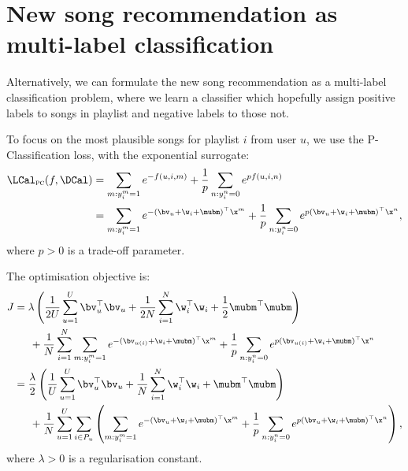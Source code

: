 \section{New song recommendation as multi-label classification}

Alternatively, we can formulate the new song recommendation as a multi-label classification problem,
where we learn a classifier which hopefully assign positive labels to songs in playlist and negative labels to those not.

To focus on the most plausible songs for playlist $i$ from user $u$,
we use the P-Classification loss, with the exponential surrogate:
\begin{equation*}
\begin{aligned}
\LCal_\textsc{pc}(f, \DCal) 
&= \sum_{m: y_i^m = 1} e^{-f(u, i, m)} + \frac{1}{p} \sum_{n: y_i^n = 0} e^{p f(u, i, n)} \\
&= \sum_{m: y_i^m = 1} e^{-(\bv_u + \w_i + \mubm)^\top \x^m} 
   + \frac{1}{p} \sum_{n: y_i^n = 0} e^{p (\bv_u + \w_i + \mubm)^\top \x^n},
\end{aligned}
\end{equation*}
where $p > 0$ is a trade-off parameter.

The optimisation objective is:
\begin{equation*}
\begin{aligned}
J &= \lambda \left( \frac{1}{2 U} \sum_{u=1}^U \bv_u^\top \bv_u 
     + \frac{1}{2 N} \sum_{i=1}^N \w_i^\top \w_i + \frac{1}{2} \mubm^\top \mubm \right) \\
& \hspace{1.5em}
     + \frac{1}{N} \sum_{i=1}^N \sum_{m: y_i^m = 1} e^{-(\bv_{u(i)} + \w_i + \mubm)^\top \x^m} 
     + \frac{1}{p} \sum_{n: y_i^n = 0} e^{p (\bv_{u(i)} + \w_i + \mubm)^\top \x^n} \\
&= \frac{\lambda}{2} \left( \frac{1}{U} \sum_{u=1}^U \bv_u^\top \bv_u 
     + \frac{1}{N} \sum_{i=1}^N \w_i^\top \w_i + \mubm^\top \mubm \right) \\
& \hspace{1.5em}
     + \frac{1}{N} \sum_{u=1}^U \sum_{i \in P_u} \left(
       \sum_{m: y_i^m = 1} e^{-(\bv_{u} + \w_i + \mubm)^\top \x^m} 
       + \frac{1}{p} \sum_{n: y_i^n = 0} e^{p (\bv_{u} + \w_i + \mubm)^\top \x^n} \right),
\end{aligned}
\end{equation*}
where $\lambda > 0$ is a regularisation constant.

